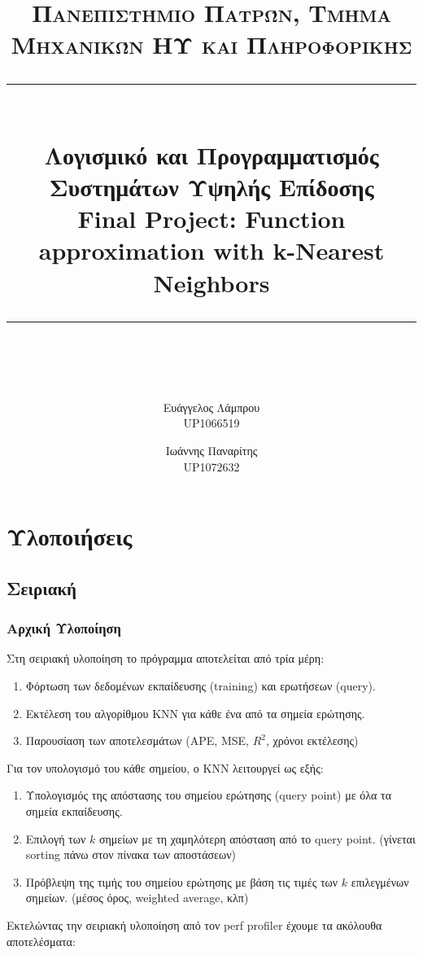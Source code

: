 \documentclass[11pt]{scrartcl} %
\title{	
	\normalfont\normalsize
	\textsc{Πανεπιστήμιο Πατρών, Τμήμα Μηχανικών ΗΥ και Πληροφορικής}\\ %
	\vspace{25pt} %
	\rule{\linewidth}{0.5pt}\\ %
	\vspace{20pt} %
    {\Large Λογισμικό και Προγραμματισμός Συστημάτων Υψηλής Επίδοσης \\ \textbf{Final Project:} Function approximation with k-Nearest Neighbors}\\ %
	\vspace{12pt} %
	\rule{\linewidth}{2pt}\\ %
	\vspace{12pt} %
}
\author{Ευάγγελος Λάμπρου \\UP1066519 \and Ιωάννης Παναρίτης \\UP1072632} %
\date{} %
\begin{document}
\maketitle 


\section{Υλοποιήσεις}

\subsection{Σειριακή}

\subsubsection{Αρχική Υλοποίηση}

Στη σειριακή υλοποίηση το πρόγραμμα αποτελείται από τρία μέρη: 

\begin{enumerate}
    \item Φόρτωση των δεδομένων εκπαίδευσης (training) και ερωτήσεων (query).
    \item Εκτέλεση του αλγορίθμου KNN για κάθε ένα από τα σημεία ερώτησης.
    \item Παρουσίαση των αποτελεσμάτων (APE, MSE, $R^2$, χρόνοι εκτέλεσης)
\end{enumerate}

Για τον υπολογισμό του κάθε σημείου, ο KNN λειτουργεί ως εξής:

\begin{enumerate}
    \item Υπολογισμός της απόστασης του σημείου ερώτησης (query point) με όλα τα σημεία εκπαίδευσης.
    \item Επιλογή των $k$ σημείων με τη χαμηλότερη απόσταση από το query point. (γίνεται sorting πάνω στον πίνακα των αποστάσεων)
    \item Πρόβλεψη της τιμής του σημείου ερώτησης με βάση τις τιμές των $k$ επιλεγμένων σημείων. (μέσος όρος, weighted average, κλπ)
\end{enumerate}

Εκτελώντας την σειριακή υλοποίηση από τον perf profiler έχουμε τα ακόλουθα αποτελέσματα:


\end{document}
